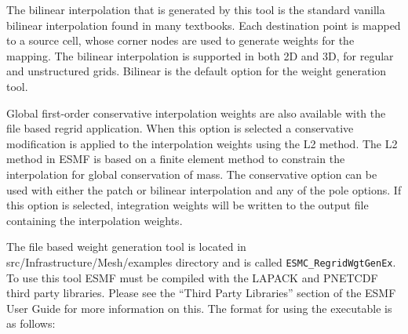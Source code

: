 The bilinear interpolation that is generated by this tool is the standard vanilla 
bilinear interpolation found in many textbooks.  Each destination point is mapped to
a source cell, whose corner nodes are used to generate weights for the mapping.  The 
bilinear interpolation is supported in both 2D and 3D, for regular and unstructured 
grids.  Bilinear is the default option for the weight generation tool.

Global first-order conservative interpolation weights are also available with the 
file based regrid application. When this option is selected a conservative modification
is applied to the interpolation weights using the L2 method.  The L2 method in ESMF is based
on a finite element method to constrain the interpolation for global conservation of 
mass.  The conservative option can be used with either the 
patch or bilinear interpolation
and any of the pole options.  If this option is selected, integration weights will be
written to the output file containing the interpolation weights.

The file based weight generation tool is located in src/Infrastructure/Mesh/examples 
directory and is called {\tt ESMC\_RegridWgtGenEx}. To use this tool ESMF must be compiled 
with the LAPACK and PNETCDF third party libraries. Please see the ``Third Party Libraries'' 
section of the ESMF User Guide for more information on this. The format for using the 
executable is as follows:

